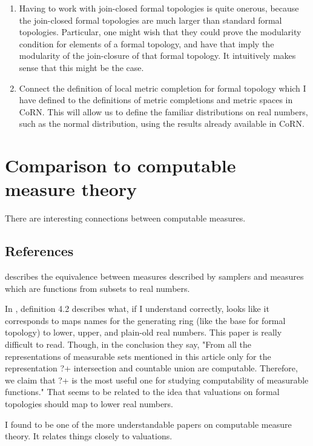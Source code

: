 \begin{enumerate}
\item Having to work with join-closed formal topologies is quite onerous, because the join-closed formal topologies are much larger than standard formal topologies. Particular, one might wish that they could prove the modularity condition for elements of a formal topology, and have that imply the modularity of the join-closure of that formal topology. It intuitively makes sense that this might be the case.

\item Connect the definition of local metric completion for formal topology which I have defined to the definitions of metric completions and metric spaces in CoRN\cite{oconnor2008}. This will allow us to define the familiar distributions on real numbers, such as the normal distribution, using the results already available in CoRN. 
\end{enumerate}

\section{Comparison to computable measure theory}

There are interesting connections between computable measures.

\subsection{References}

\cite{schroder2007} describes the equivalence between measures described by samplers and measures which are functions from subsets to real numbers.

In \cite{weihrauch2014}, definition 4.2 describes what, if I understand correctly, looks like it corresponds to maps names for the generating ring (like the base for formal topology) to lower, upper, and plain-old real numbers. This paper is really difficult to read. Though, in the conclusion they say, "From all the representations of measurable sets mentioned in this article only for the representation ?+ intersection and countable union are computable. Therefore, we claim that ?+ is the most useful one for studying computability of measurable functions." That seems to be related to the idea that valuations on formal topologies should map to lower real numbers.

I found \cite{collins2014} to be one of the more understandable papers on computable measure theory. It relates things closely to valuations.


